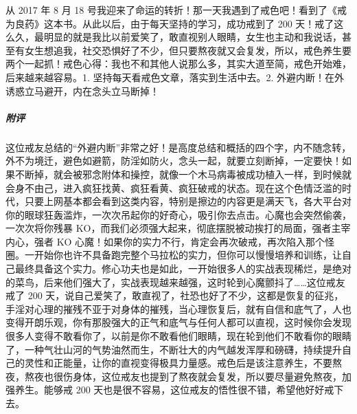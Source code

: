 \begin{case}
    从 2017 年 8 月 18 号我迎来了命运的转折！那一天我遇到了戒色吧！看到了《戒为良药》这本书。从此以后，由于每天坚持的学习，成功戒到了 200 天！戒了这么久，最明显的就是我比以前爱笑了，敢直视别人眼睛，女生也主动和我说话，甚至有女生想追我，社交恐惧好了不少，但只要熬夜就又会复发，所以，戒色养生要两个一起抓！戒色心得：我也不和其他人说那么多，其实大道至简，戒色开始难，后来越来越容易。1. 坚持每天看戒色文章，落实到生活中去。2. 外避内断！在外诱惑立马避开，内在念头立马断掉！
    \subparagraph{附评} 这位戒友总结的“外避内断”非常之好！是高度总结和概括的四个字，内不随念转，外不为境迁，避色如避箭，防淫如防火，念头一起，就要立刻断掉，一定要快！如果不断掉，就会被邪念附体和操控，就像一个木马病毒被成功植入一样，到时候就会身不由己，进入疯狂找黄、疯狂看黄、疯狂破戒的状态。现在这个色情泛滥的时代，只要上网基本都会看到这类内容，特别是擦边的内容更是满天飞，各大平台对你的眼球狂轰滥炸，一次次吊起你的好奇心，吸引你去点击。心魔也会突然偷袭，一次次将你残暴 KO，而我们必须强大起来，彻底摆脱被动挨打的局面，强者主宰内心，强者 KO 心魔！如果你的实力不行，肯定会再次破戒，再次陷入那个怪圈。一开始你也许不具备跑完整个马拉松的实力，但你可以慢慢培养和训练，让自己最终具备这个实力。修心功夫也是如此，一开始很多人的实战表现稀烂，是绝对的菜鸟，后来他们强大了，实战表现越来越强，这时轮到心魔颤抖了……这位戒友戒了 200 天，说自己爱笑了，敢直视了，社恐也好了不少，这都是恢复的征兆，手淫对心理的摧残不亚于对身体的摧残，当心理恢复后，就有自信和底气了，人也变得开朗乐观，你有那股强大的正气和底气与任何人都可以直视，这时候你会发现很多人变得不敢看你了，以前是你不敢看他们眼睛，现在轮到他们不敢看你的眼睛了，一种气壮山河的气势油然而生，不断壮大的内气越发浑厚和磅礴，持续提升自己的灵性和正能量，让你的直视变得极具力量感。戒色后是该注意养生，不要熬夜，熬夜也很伤身体，这位戒友也提到了熬夜就会复发，所以要尽量避免熬夜，加强养生。能够戒 200 天也是很不容易，这位戒友的悟性很不错，希望他好好戒下去。
\end{case}

